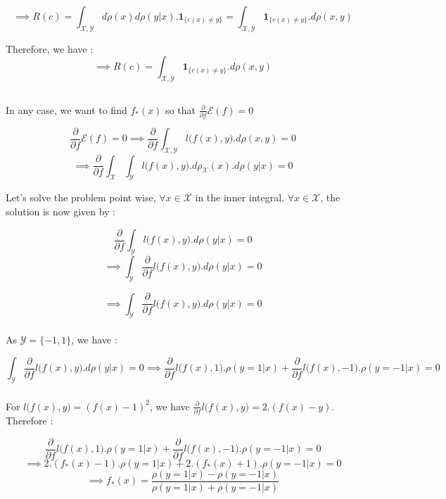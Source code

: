 \documentclass[final,3p,times,12pt]{article}
\begin{document}
\[ \implies
R(c) = \int_{\mathcal{X}, \mathcal{Y}} d\rho(x) d\rho(y|x).\mathbf{1}_{\{c(x)\neq y\}} =  \int_{\mathcal{X}, \mathcal{Y}} \mathbf{1}_{\{c(x)\neq y\}}.d\rho(x,y)
\]

Therefore, we have : \[ \implies
R(c) = \int_{\mathcal{X}, \mathcal{Y}} \mathbf{1}_{\{c(x)\neq y\}}.d\rho(x,y)
\]


\subsection{} In any case, we want to find $f_*(x)$ so that $\frac{\partial}{\partial f}\mathcal{E}(f) = 0$

\[
\frac{\partial}{\partial f}\mathcal{E}(f) = 0 \implies \frac{\partial}{\partial f} \int _{\mathcal{X,Y}} l\big(f(x),y\big).d\rho(x,y) = 0
\]
\[ \implies \frac{\partial}{\partial f} \int _{\mathcal{X}}\int_{\mathcal{Y}} l\big(f(x),y\big).d\rho_{\mathcal{X}}(x).d\rho(y|x) = 0
\]

Let's solve the problem point wise, $\forall x \in \mathcal{X}$ in the inner integral. $\forall x \in \mathcal{X}$, the solution is now given by : 

\[ \frac{\partial}{\partial f} \int_{\mathcal{Y}} l\big(f(x),y\big).d\rho(y|x) = 0
\]
\[ \implies \int_{\mathcal{Y}} \frac{\partial}{\partial f} l\big(f(x),y\big).d\rho(y|x) = 0
\]

\[ \implies \int_{\mathcal{Y}} \frac{\partial}{\partial f} l\big(f(x),y\big).d\rho(y|x) = 0
\] \\

As $\mathcal{Y} = \{-1,1\}$, we have : 

\[ \int_{\mathcal{Y}} \frac{\partial}{\partial f} l\big(f(x),y\big).d\rho(y|x) = 0 \implies \frac{\partial}{\partial f} l\big(f(x),1\big).\rho(y=1|x) + \frac{\partial}{\partial f} l\big(f(x),-1\big).\rho(y=-1|x) = 0
\] 

\subsubsection{} 
For $l\big(f(x),y\big) = (f(x)-1)^2$, we have $\frac{\partial}{\partial f} l\big(f(x),y\big) = 2.(f(x)-y)$. Therefore : 

\[ \frac{\partial}{\partial f} l\big(f(x),1\big).\rho(y=1|x) + \frac{\partial}{\partial f} l\big(f(x),-1\big).\rho(y=-1|x) = 0  \]
\[\implies 2.(f_*(x)-1).\rho(y=1|x) + 2.(f_*(x)+1).\rho(y=-1|x) = 0
\]
\[\implies f_*(x) = \frac{\rho(y=1|x) - \rho(y=-1|x)}{\rho(y=1|x) + \rho(y=-1|x)}
\]
\end{document}
